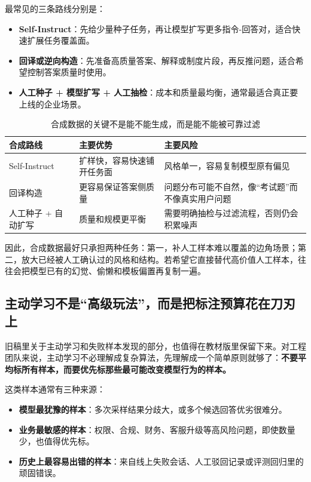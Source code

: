 最常见的三条路线分别是：
\begin{itemize}
  \item \textbf{Self-Instruct}：先给少量种子任务，再让模型扩写更多指令-回答对，适合快速扩展任务覆盖面。
  \item \textbf{回译或逆向构造}：先准备高质量答案、解释或制度片段，再反推问题，适合希望控制答案质量时使用。
  \item \textbf{人工种子 + 模型扩写 + 人工抽检}：成本和质量最均衡，通常最适合真正要上线的企业场景。
\end{itemize}

\begin{table}[H]
\centering
\small
\begin{tabularx}{\textwidth}{>{\raggedright\arraybackslash}p{2.8cm}>{\raggedright\arraybackslash}p{3cm}>{\raggedright\arraybackslash}X}
\toprule
\textbf{合成路线} & \textbf{主要优势} & \textbf{主要风险} \\
\midrule
Self-Instruct & 扩样快，容易快速铺开任务面 & 风格单一，容易复制模型原有偏见 \\
回译构造 & 更容易保证答案侧质量 & 问题分布可能不自然，像“考试题”而不像真实用户问题 \\
人工种子 + 自动扩写 & 质量和规模更平衡 & 需要明确抽检与过滤流程，否则仍会积累噪声 \\
\bottomrule
\end{tabularx}
\caption{合成数据的关键不是能不能生成，而是能不能被可靠过滤}
\label{tab:synthetic-data-routes}
\end{table}

因此，合成数据最好只承担两种任务：第一，补人工样本难以覆盖的边角场景；第二，放大已经被人工确认过的风格和结构。若希望它直接替代高价值人工样本，往往会把模型已有的幻觉、偷懒和模板偏置再复制一遍。

\subsection{主动学习不是“高级玩法”，而是把标注预算花在刀刃上}
旧稿里关于主动学习和失败样本发现的部分，也值得在教材版里保留下来。对工程团队来说，主动学习不必理解成复杂算法，先理解成一个简单原则就够了：\textbf{不要平均标所有样本，而要优先标那些最可能改变模型行为的样本。}

这类样本通常有三种来源：
\begin{itemize}
  \item \textbf{模型最犹豫的样本}：多次采样结果分歧大，或多个候选回答优劣很难分。
  \item \textbf{业务最敏感的样本}：权限、合规、财务、客服升级等高风险问题，即使数量少，也值得优先标。
  \item \textbf{历史上最容易出错的样本}：来自线上失败会话、人工驳回记录或评测回归里的顽固错误。
\end{itemize}

